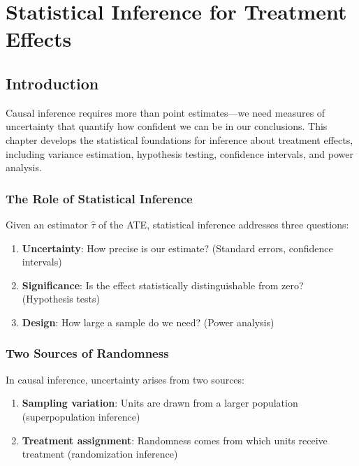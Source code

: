\chapter{Statistical Inference for Treatment Effects}
\label{ch:inference}


\section{Introduction}
\label{sec:inference_intro}

Causal inference requires more than point estimates---we need measures of uncertainty that quantify how confident we can be in our conclusions. This chapter develops the statistical foundations for inference about treatment effects, including variance estimation, hypothesis testing, confidence intervals, and power analysis.

\subsection{The Role of Statistical Inference}

Given an estimator $\hat{\tau}$ of the ATE, statistical inference addresses three questions:
\begin{enumerate}
    \item \textbf{Uncertainty}: How precise is our estimate? (Standard errors, confidence intervals)
    \item \textbf{Significance}: Is the effect statistically distinguishable from zero? (Hypothesis tests)
    \item \textbf{Design}: How large a sample do we need? (Power analysis)
\end{enumerate}

\subsection{Two Sources of Randomness}

In causal inference, uncertainty arises from two sources:

\begin{enumerate}
    \item \textbf{Sampling variation}: Units are drawn from a larger population (superpopulation inference)
    \item \textbf{Treatment assignment}: Randomness comes from which units receive treatment (randomization inference)
\end{enumerate}

